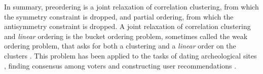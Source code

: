 In summary, preordering is a joint relaxation of correlation clustering, from which the symmetry constraint is dropped, and partial ordering, from which the antisymmetry constraint is dropped.
A joint relaxation of correlation clustering and \emph{linear} ordering is the bucket ordering problem, sometimes called the weak ordering problem, that asks for both a clustering and a \emph{linear} order on the clusters \citep{gurgel1997adjacency,fiorini2003combinatorial,fiorini2004weak,fiorini20060}.
This problem has been applied to the tasks of dating archeological sites \citep{gionis2006algorithms}, finding consensus among voters \cite{aledo2018approaching,aledo2021highly} and constructing user recommendations \citep{jurewicz2023catalog}.
